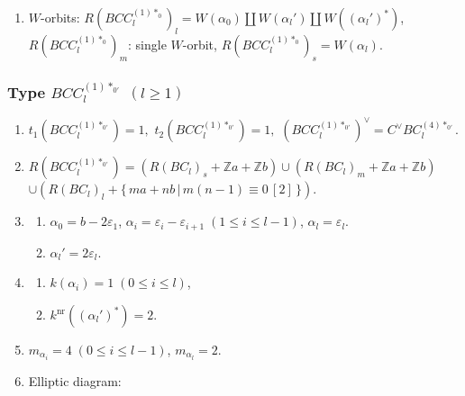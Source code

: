 \documentclass[11pt]{amsart}
\newcommand{\Z}{\mathbb{Z}}
\newcommand{\nr}{\mathrm{nr}}
\newcommand{\vep}{\varepsilon}
\begin{document}
{\begin{enumerate}
\begin{center}
{\begin{tikzpicture}[scale=0.9]
\end{tikzpicture}}
\end{center}
\item $W$-orbits: $R(BCC_l^{(1)\ast_{0}})_l=W(\alpha_0) \amalg 
W(\alpha_l') \amalg W((\alpha_l')^\ast)$, \\
\phantom{$W$-orbits:} $R(BCC_l^{(1)\ast_0})_m$: single $W$-orbit, \quad $R(BCC_l^{(1)\ast_0})_s=W(\alpha_l)$.
\end{enumerate}

\subsubsection{Type $BCC_l^{(1)\ast_{0'}}$ $(l\geq 1)$}\label{data:BCC-3}
\begin{enumerate}
\item $t_1(BCC_l^{(1)\ast_{0'}})=1,$ \quad $t_2(BCC_l^{(1)\ast_{0'}})=1,$ \quad $(BCC_l^{(1)\ast_{0'}})^\vee = C^\vee BC_l^{(4)\ast_{0'}}.$
\item $R(BCC_l^{(1)\ast_{0'}})=(R(BC_l)_s+\Z a+\Z b) \cup (R(BC_l)_m+\Z a+\Z b)$ \\
 $\cup (R(BC_l)_l+\{\, ma+nb\, \vert \, m(n-1) \equiv 0\, [2]\, \})$.
\item 
\begin{enumerate}
\item[i)] $\alpha_0=b-2\vep_1$, $\alpha_i=\vep_i-\vep_{i+1}\; 
(1\leq i\leq l-1)$, $\alpha_l=\vep_l$. 
\item[ii)] $\alpha_l'=2\vep_l$.
\end{enumerate}
\item 
\begin{enumerate}
\item[i)] $k(\alpha_i)=1\; (0\leq i\leq l)$, 
\item[ii)] $k^{\nr}((\alpha_l')^\ast)=2$. 
\end{enumerate}
\item $m_{\alpha_i}=4\; (0\leq i\leq l-1)$, \;  $m_{\alpha_l}=2$.
\item Elliptic diagram:




\begin{center}
\end{center}
\end{enumerate}}
\end{document}
